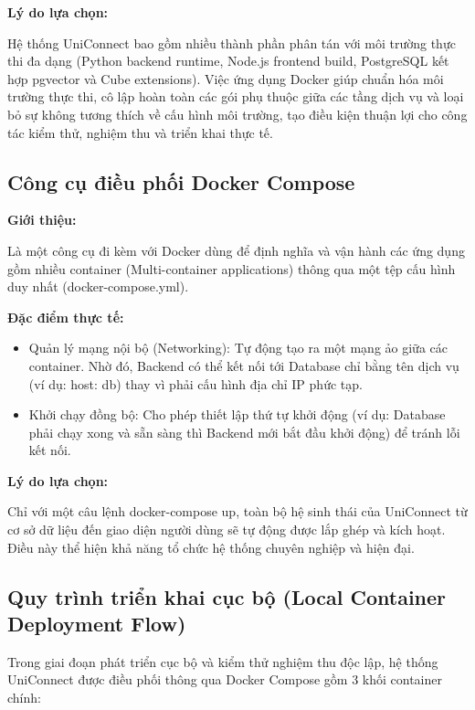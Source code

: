 \textbf{Lý do lựa chọn:} 

Hệ thống UniConnect bao gồm nhiều thành phần phân tán với môi trường thực thi đa dạng (Python backend runtime, Node.js frontend build, PostgreSQL kết hợp pgvector và Cube extensions). Việc ứng dụng Docker giúp chuẩn hóa môi trường thực thi, cô lập hoàn toàn các gói phụ thuộc giữa các tầng dịch vụ và loại bỏ sự không tương thích về cấu hình môi trường, tạo điều kiện thuận lợi cho công tác kiểm thử, nghiệm thu và triển khai thực tế.

\subsection{Công cụ điều phối Docker Compose}

\textbf{Giới thiệu:}

Là một công cụ đi kèm với Docker dùng để định nghĩa và vận hành các ứng dụng gồm nhiều container (Multi-container applications) thông qua một tệp cấu hình duy nhất (docker-compose.yml)\cite{mouat2015using}.

\textbf{Đặc điểm thực tế:}

\begin{itemize}
    \item Quản lý mạng nội bộ (Networking): Tự động tạo ra một mạng ảo giữa các container. Nhờ đó, Backend có thể kết nối tới Database chỉ bằng tên dịch vụ (ví dụ: host: db) thay vì phải cấu hình địa chỉ IP phức tạp.

    \item Khởi chạy đồng bộ: Cho phép thiết lập thứ tự khởi động (ví dụ: Database phải chạy xong và sẵn sàng thì Backend mới bắt đầu khởi động) để tránh lỗi kết nối.
\end{itemize}

\textbf{Lý do lựa chọn:}

Chỉ với một câu lệnh docker-compose up, toàn bộ hệ sinh thái của UniConnect từ cơ sở dữ liệu đến giao diện người dùng sẽ tự động được lắp ghép và kích hoạt. Điều này thể hiện khả năng tổ chức hệ thống chuyên nghiệp và hiện đại.

\subsection{Quy trình triển khai cục bộ (Local Container Deployment Flow)}

Trong giai đoạn phát triển cục bộ và kiểm thử nghiệm thu độc lập, hệ thống UniConnect được điều phối thông qua Docker Compose gồm 3 khối container chính:

